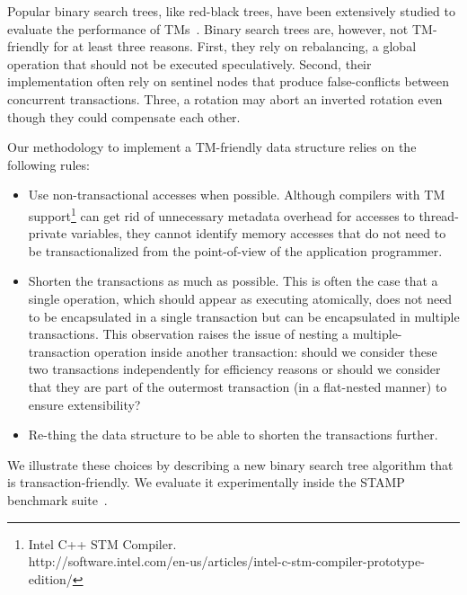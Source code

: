 \documentclass[10pt]{sigplanconf}
\begin{document}
Popular binary search trees, like red-black trees, have been extensively 
studied to evaluate the performance of TMs~\cite{ST95,HLMS03,HK08,FFR08,DFGG11}.
Binary search trees are, however, not TM-friendly for at least three reasons. 
First, they rely on rebalancing, a global operation that should not be 
executed speculatively. Second, their implementation often rely on sentinel 
nodes that produce false-conflicts between concurrent transactions. Three, 
a rotation may abort an inverted rotation even though they could compensate 
each other.

Our methodology to implement a TM-friendly data structure relies on the following rules:
\begin{itemize}
	\item Use non-transactional accesses when possible. Although compilers with TM support\footnote{Intel C++ STM Compiler.\\http://software.intel.com/en-us/articles/intel-c-stm-compiler-prototype-edition/} can get rid of 
	unnecessary metadata overhead for accesses to thread-private variables, they cannot identify memory accesses that do not need to 
	be transactionalized from the point-of-view of the application programmer.
	\item Shorten the transactions as much as possible. This is often the case that a single operation, which should appear as executing 
	atomically, does not need to be encapsulated in a single transaction but can be encapsulated in multiple transactions. This observation raises the issue
	of nesting a multiple-transaction operation inside another transaction: should we consider these two transactions independently
	for efficiency reasons or should we consider that they are part of the outermost transaction (in a flat-nested manner) to ensure 
	extensibility?
	\item Re-thing the data structure to be able to shorten the transactions further.
\end{itemize}
We illustrate these choices by describing a new binary search tree algorithm
that is transaction-friendly. We evaluate it experimentally inside the 
STAMP benchmark suite~\cite{CCKO08}.  
\end{document}
